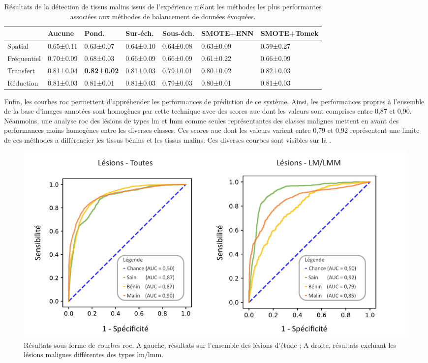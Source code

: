 \begin{table}[H]
    \begin{tabular}{lllllll}
        \toprule
                    & Aucune    & Pond.             & Sur-éch.  & Sous-éch. & SMOTE+ENN & SMOTE+Tomek\\ \hline
        Spatial     & 0.65±0.11 & 0.63±0.07         & 0.64±0.10 & 0.64±0.08 & 0.63±0.09 & 0.59±0.27  \\
        Fréquentiel & 0.70±0.09 & 0.68±0.03         & 0.66±0.09 & 0.66±0.09 & 0.61±0.22 & 0.66±0.09  \\ \rowcolor[HTML]{E7E6E6} 
        Transfert   & 0.81±0.04 & \textbf{0.82±0.02}& 0.81±0.03 & 0.79±0.01 & 0.80±0.02 & 0.82±0.03  \\
        Réduction   & 0.81±0.03 & 0.81±0.01         & 0.81±0.03 & 0.79±0.03 & 0.80±0.01 & 0.81±0.03  \\ \bottomrule 
    \end{tabular}
    \caption{Résultats de la détection de tissus malins issus de l'expérience mêlant les méthodes les plus performantes associées aux méthodes de balancement de données évoquées.}
    \label{tab:results_balancement_malignant}
\end{table}\par

Enfin, les courbes \gls{roc} permettent d'appréhender les performances de prédiction de ce système. Ainsi, les performances propres à l'ensemble de la base d'images annotées sont homogènes par cette technique avec des scores \gls{auc} dont les valeurs sont comprises entre 0,87 et 0,90. Néanmoins, une analyse \gls{roc} des lésions de types \gls{lm} et \gls{lmm} comme seules représentantes des classes malignes mettent en avant des performances moins homogènes entre les diverses classes. Ces scores \gls{auc} dont les valeurs varient entre 0,79 et 0,92 représentent une limite de ces méthodes a différencier les tissus bénins et les tissus malins. Ces diverses courbes sont visibles sur la .\par

\begin{figure}[H]
    \centering
    \includegraphics[width=\textwidth]{contents/chapter_5/resources/results_image_classification_roc.pdf}
    \caption{Résultats sous forme de courbes \gls{roc}. A gauche, résultats sur l'ensemble des lésions d'étude ; A droite, résultats excluant les lésions malignes différentes des types \gls{lm}/\gls{lmm}.}
    \label{fig:results_image_classification_roc}
\end{figure}\par

